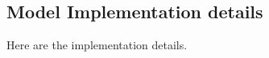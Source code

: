 \label{sec:supplementary}


\subsection*{Model Implementation details}
\label{sebsec:implementation_details}
Here are the implementation details.
%
